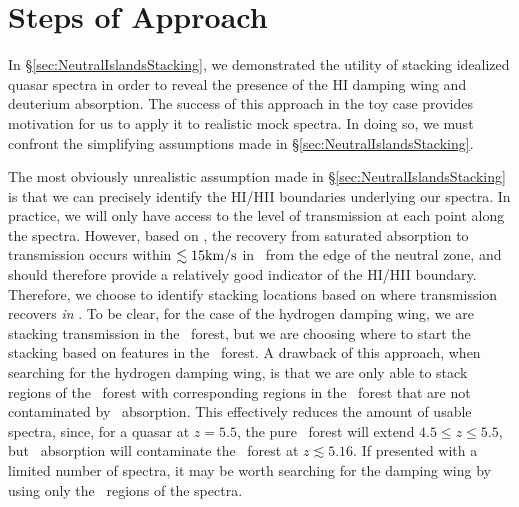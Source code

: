 \section{Steps of Approach} \label{sec:NeutralIslandsRealSpectra}


In \S\ref{sec:NeutralIslandsStacking}, we demonstrated the utility of stacking idealized quasar spectra in order to reveal the presence of the HI damping wing and deuterium absorption. The success of this approach in the toy case provides motivation for us to apply it to realistic mock spectra. In doing so, we must confront the simplifying assumptions made in \S\ref{sec:NeutralIslandsStacking}. 


The most obviously unrealistic assumption made in \S\ref{sec:NeutralIslandsStacking} is that we can precisely identify the HI/HII boundaries underlying our spectra. In practice, we will only have access to the level of transmission at each point along the spectra. However, based on , the recovery from saturated absorption to transmission occurs within $\lesssim 15\text{km}/\text{s}$ in \lyb\ from the edge of the neutral zone, and should therefore provide a relatively
good indicator of the HI/HII boundary. Therefore, we choose to identify stacking locations based on where transmission recovers \textit{in \lyb}.
To be clear, for the case of the hydrogen damping wing, we are stacking transmission in the \lya\ forest, but we are choosing where to start the stacking based on features in the \lyb\ forest. A drawback of this approach, when searching for the hydrogen damping wing, is that we are only able to stack regions of the \lya\ forest with corresponding regions in the \lyb\ forest that are not contaminated by \lyc\ absorption. This effectively reduces the amount of usable spectra, since, for a quasar at $z = 5.5$, the pure \lya\ forest will extend $4.5 \leq z \leq 5.5$, but \lyc\ absorption will contaminate the \lyb\ forest at $z \lesssim 5.16$. If presented with a limited number of spectra, it may be worth searching for the damping wing by using only the \lya\ regions of the spectra. 


